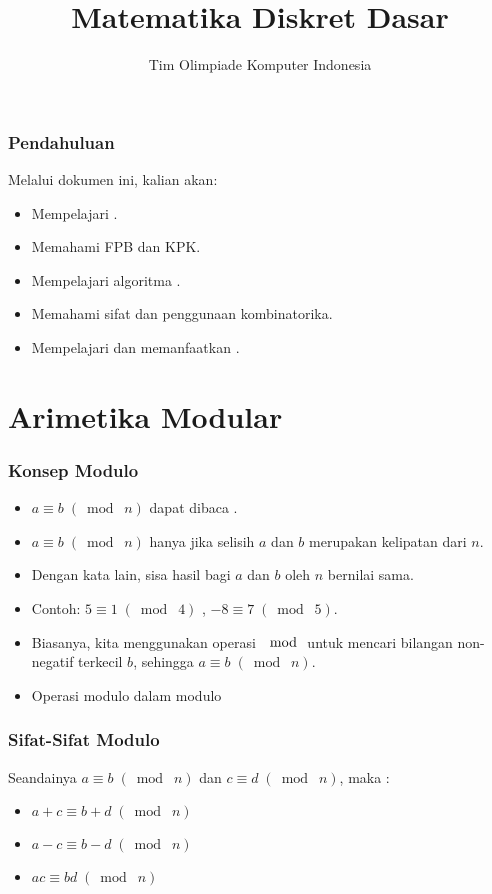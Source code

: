 

\title{Matematika Diskret Dasar}
\author{Tim Olimpiade Komputer Indonesia}
\date{}



\begin{frame}
\titlepage
\end{frame}

\begin{frame}
\frametitle{Pendahuluan}
Melalui dokumen ini, kalian akan:
\begin{itemize}
  \item Mempelajari .
  \item Memahami FPB dan KPK.
  \item Mempelajari algoritma .
  \item Memahami sifat dan penggunaan kombinatorika.
  \item Mempelajari dan memanfaatkan .
\end{itemize}
\end{frame}

\section{Arimetika Modular}
\frame{\sectionpage}

\begin{frame}
\frametitle{Konsep Modulo}
\begin{itemize}
  \item $a \equiv b \;(\bmod\; n)$ dapat dibaca .
  \item $a \equiv b \;(\bmod\; n)$ hanya jika selisih $a$ dan $b$ merupakan kelipatan dari $n$.
  \item Dengan kata lain, sisa hasil bagi $a$ dan $b$ oleh $n$ bernilai sama.
  \item Contoh: $5 \equiv 1 \;(\bmod\; 4)$ , $-8 \equiv 7 \;(\bmod\; 5)$.
  \item Biasanya, kita menggunakan operasi $\mod$ untuk mencari bilangan non-negatif terkecil $b$, sehingga $a \equiv b \;(\bmod\; n)$.
  \item Operasi modulo  dalam modulo 
\end{itemize}
\end{frame}

\begin{frame}
\frametitle{Sifat-Sifat Modulo}
Seandainya $a \equiv b \;(\bmod\; n)$ dan $c \equiv d \;(\bmod\; n)$, maka :
\begin{itemize}
  \item $a + c \equiv b + d \;(\bmod\; n)$
  \item $a - c \equiv b - d \;(\bmod\; n)$
  \item $ac \equiv bd \;(\bmod\; n)$
\end{itemize}
\end{frame} 

